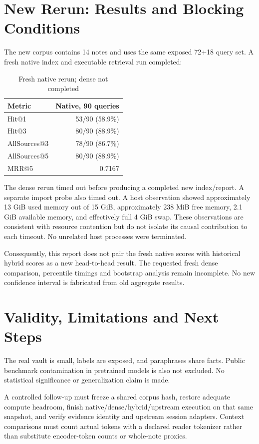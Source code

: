 \documentclass[conference]{IEEEtran}
\begin{document}
\section{New Rerun: Results and Blocking Conditions}
The new corpus contains 14 notes and uses the same exposed 72+18 query set. A fresh native index and executable retrieval run completed:
\begin{table}[h]
\caption{Fresh native rerun; dense not completed}
\centering\small
\begin{tabular}{@{}lr@{}}
\toprule
Metric & Native, 90 queries \\
\midrule
Hit@1 & 53/90 (58.9\%) \\
Hit@3 & 80/90 (88.9\%) \\
AllSources@3 & 78/90 (86.7\%) \\
AllSources@5 & 80/90 (88.9\%) \\
MRR@5 & 0.7167 \\
\bottomrule
\end{tabular}
\end{table}

The dense rerun timed out before producing a completed new index/report. A separate import probe also timed out. A host observation showed approximately 13 GiB used memory out of 15 GiB, approximately 238 MiB free memory, 2.1 GiB available memory, and effectively full 4 GiB swap. These observations are consistent with resource contention but do not isolate its causal contribution to each timeout. No unrelated host processes were terminated.

Consequently, this report does not pair the fresh native scores with historical hybrid scores as a new head-to-head result. The requested fresh dense comparison, percentile timings and bootstrap analysis remain incomplete. No new confidence interval is fabricated from old aggregate results.

\section{Validity, Limitations and Next Steps}
The real vault is small, labels are exposed, and paraphrases share facts. Public benchmark contamination in pretrained models is also not excluded. No statistical significance or generalization claim is made.

A controlled follow-up must freeze a shared corpus hash, restore adequate compute headroom, finish native/dense/hybrid/upstream execution on that same snapshot, and verify evidence identity and upstream session adapters. Context comparisons must count actual tokens with a declared reader tokenizer rather than substitute encoder-token counts or whole-note proxies.
\end{document}
